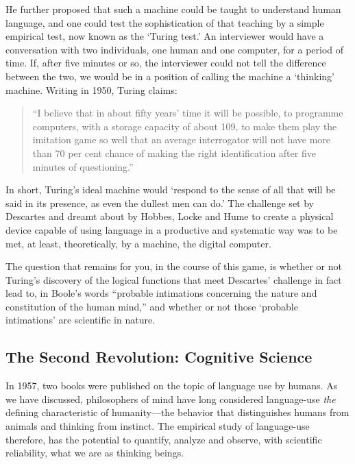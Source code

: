 \begin{refsection}
He further proposed that such a machine could be taught to understand human language, and one could test the sophistication of that teaching by a simple empirical test, now known as the `Turing test.' An interviewer would have a conversation with two individuals, one human and one computer, for a period of time. If, after five minutes or so, the interviewer could not tell the difference between the two, we would be in a position of calling the machine a `thinking' machine. Writing in 1950, Turing claims:

\begin{quote}

“I believe that in about fifty years' time it will be possible, to programme computers, with a storage capacity of about 109, to make them play the imitation game so well that an average interrogator will not have more than 70 per cent chance of making the right identification after five minutes of questioning.”
\end{quote}

In short, Turing's ideal machine would `respond to the sense of all that will be said in its presence, as even the dullest men can do.' The challenge set by Descartes and dreamt about by Hobbes, Locke and Hume to create a physical device capable of using language in a productive and systematic way was to be met, at least, theoretically, by a machine, the digital computer.

The question that remains for you, in the course of this game, is whether or not Turing's discovery of the logical functions that meet Descartes' challenge in fact lead to, in Boole's words “probable intimations concerning the nature and constitution of the human mind,” and whether or not those `probable intimations' are scientific in nature.

\subsection{The Second Revolution: Cognitive Science}
\label{thesecondrevolution:cognitivescience}

In 1957, two books were published on the topic of language use by humans. As we have discussed, philosophers of mind have long considered language-use \emph{the} defining characteristic of humanity---the behavior that distinguishes humans from animals and thinking from instinct. The empirical study of language-use therefore, has the potential to quantify, analyze and observe, with scientific reliability, what we are as thinking beings.


\end{refsection}
